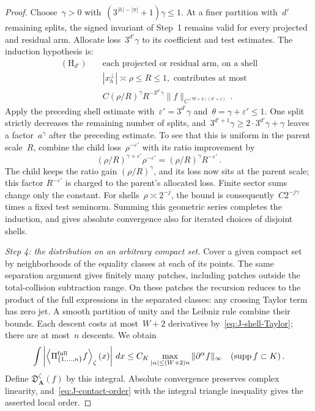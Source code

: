 \begin{proof}
Choose~$\gamma>0$ with~$(3^{|h|-|\pi|}+1)\gamma\le1$. At a finer partition with~$d'$ remaining splits, the signed invariant of Step~1 remains valid for every projected and residual arm. Allocate loss~$3^{d'}\gamma$ to its coefficient and test estimates. The induction hypothesis is:
\begin{equation*}
\begin{aligned}
(\mathrm H_{d'})\quad&\text{each projected or residual arm, on a shell}\\
&|x_h^\perp|\asymp\rho\le R\le1,\text{ contributes at most}\\
&C(\rho/R)^\gamma R^{-3^{d'}\gamma}
  \|f\|_{C^{(W+2)(d'+1)}}\,.
\end{aligned}
\end{equation*}
Apply the preceding shell estimate with~$\varepsilon'=3^{d'}\gamma$ and~$\theta=\gamma+\varepsilon'\le1$. One split strictly decreases the remaining number of splits, and~$3^{d'+1}\gamma\ge2\cdot3^{d'}\gamma+\gamma$ leaves a factor~$a^\gamma$ after the preceding estimate. To see that this is uniform in the parent scale~$R$, combine the child loss~$\rho^{-\varepsilon'}$ with its ratio improvement by
\begin{equation*}
(\rho/R)^{\gamma+\varepsilon'}\rho^{-\varepsilon'}
=(\rho/R)^{\gamma}R^{-\varepsilon'}\,.
\end{equation*}
The child keeps the ratio gain $(\rho/R)^\gamma$, and its loss now sits at the parent scale; this factor $R^{-\varepsilon'}$ is charged to the parent's allocated loss. Finite sector sums change only the constant. For shells~$\rho\asymp2^{-j}$, the bound is consequently~$C2^{-j\gamma}$ times a fixed test seminorm. Summing this geometric series completes the induction, and gives absolute convergence also for iterated choices of disjoint shells.

\emph{Step 4: the distribution on an arbitrary compact set.} Cover a given compact set by neighborhoods of the equality classes at each of its points. The same separation argument gives finitely many patches, including patches outside the total-collision subtraction range. On these patches the recursion reduces to the product of the full expressions in the separated classes: any crossing Taylor term has zero jet. A smooth partition of unity and the Leibniz rule combine their bounds. Each descent costs at most~$W+2$ derivatives by~\eqref{eq:J-shell-Taylor}; there are at most~$n$ descents. We obtain
\begin{equation}\label{eq:J-contact-order}
\int\left|\left\langle\Pi_{\{1,\ldots,n\}}^{\rm full}f
                    \right\rangle_\zeta(x)\right|\,dx
\le C_K\max_{|\alpha|\le(W+2)n}\|\partial^\alpha f\|_\infty
\quad(\operatorname{supp}f\subset K)\,.
\end{equation}
Define $\mathfrak D_{\boldsymbol A}^\zeta(f)$ by this integral. Absolute convergence preserves complex linearity, and~\eqref{eq:J-contact-order} with the integral triangle inequality gives the asserted local order.


\end{proof}
